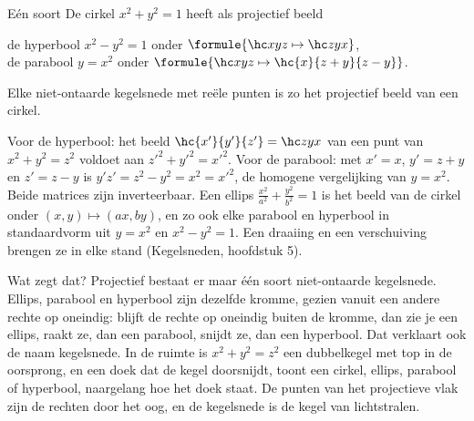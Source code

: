 \begin{theorie}
\begin{stelling}{Eén soort}
De cirkel $x^2 + y^2 = 1$ heeft als projectief beeld

\vspace{1mm}
\qquad de hyperbool $x^2 - y^2 = 1$ onder $\formule{\hc xyz \mapsto \hc zyx}$,\\
\qquad de parabool $y = x^2$ onder $\formule{\hc xyz \mapsto \hc{x}{z + y}{z - y}}$.

\vspace{1mm}
Elke niet-ontaarde kegelsnede met reële punten is zo het projectief beeld van een cirkel.
\end{stelling}

\begin{bewijs}
Voor de hyperbool: het beeld $\hc{x'}{y'}{z'} = \hc zyx$ van een punt van $x^2 + y^2 = z^2$ voldoet aan $z'^2 + y'^2 = x'^2$. Voor de parabool: met $x' = x$, $y' = z + y$ en $z' = z - y$ is $y'z' = z^2 - y^2 = x^2 = x'^2$, de homogene vergelijking van $y = x^2$. Beide matrices zijn inverteerbaar. Een ellips $\tfrac{x^2}{a^2} + \tfrac{y^2}{b^2} = 1$ is het beeld van de cirkel onder $(x, y) \mapsto (ax, by)$, en zo ook elke parabool en hyperbool in standaardvorm uit $y = x^2$ en $x^2 - y^2 = 1$. Een draaiing en een verschuiving brengen ze in elke stand (Kegelsneden, hoofdstuk 5).
\end{bewijs}
\end{theorie}

Wat zegt dat? Projectief bestaat er maar één soort niet-ontaarde kegelsnede. Ellips, parabool en hyperbool zijn dezelfde kromme, gezien vanuit een andere rechte op oneindig: blijft de rechte op oneindig buiten de kromme, dan zie je een ellips, raakt ze, dan een parabool, snijdt ze, dan een hyperbool. Dat verklaart ook de naam kegelsnede. In de ruimte is $x^2 + y^2 = z^2$ een dubbelkegel met top in de oorsprong, en een doek dat de kegel doorsnijdt, toont een cirkel, ellips, parabool of hyperbool, naargelang hoe het doek staat. De punten van het projectieve vlak zijn de rechten door het oog, en de kegelsnede is de kegel van lichtstralen.


